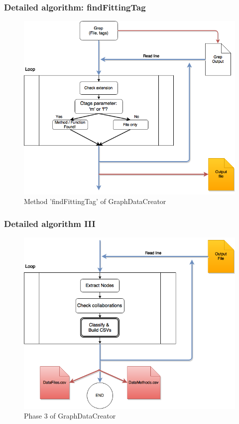 \documentclass{beamer}
\begin{document}

\begin{frame}
\frametitle{Detailed algorithm: findFittingTag}
\begin{figure}
\includegraphics[scale=0.3]{GDCfft.png} 
\caption{Method 'findFittingTag' of GraphDataCreator}
\label{fig:phasefft}
\end{figure}
\end{frame}


\begin{frame}
\frametitle{Detailed algorithm III}
\begin{figure}
\includegraphics[scale=0.35]{GDCphase3.png} 
\caption{Phase 3 of GraphDataCreator}
\label{fig:phase3}
\end{figure}
\end{frame}


\begin{frame}
\titlepage %
\end{frame}

\end{document}
